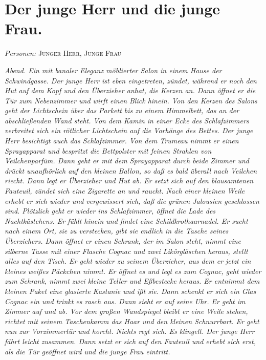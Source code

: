 \documentclass[
	final,
	a4paper,
	ngerman,
	mpinclude = true, %
	twoside = true,
	open = right,
	cleardoublepage = plain,
	DIV = 13,
	BCOR = 1cm,
	titlepage = firstiscover,
	]{scrbook}
\newcommand{\scene}{\section}
\newcommand{\setting}[1]{\vspace{-0.5\baselineskip}\centering\textit{#1}}
\newcommand{\characterlist}[1]{{\begin{center}\textit{Personen:} #1\end{center}}}
\newcommand{\thecharacter}[1]{\textup{\textsc{#1}}\xspace}
\newcommand{\theherr}{\thecharacter{Junger Herr}}
\newcommand{\thefrau}{\thecharacter{Junge Frau}}
\begin{document}
\scene{Der junge Herr und die junge Frau.}
\characterlist{\theherr, \thefrau}
\setting{Abend. Ein mit banaler Eleganz möblierter Salon in einem Hause der Schwindgasse. Der junge Herr ist eben eingetreten, zündet, während er noch den Hut auf dem Kopf und den Überzieher anhat, die Kerzen an. Dann öffnet er die Tür zum Nebenzimmer und wirft einen Blick hinein. Von den Kerzen des Salons geht der Lichtschein über das Parkett bis zu einem Himmelbett, das an der abschließenden Wand steht. Von dem Kamin in einer Ecke des Schlafzimmers verbreitet sich ein rötlicher Lichtschein auf die Vorhänge des Bettes. Der junge Herr besichtigt auch das Schlafzimmer. Von dem Trumeau nimmt er einen Sprayapparat und bespritzt die Bettpolster mit feinen Strahlen von Veilchenparfüm. Dann geht er mit dem Sprayapparat durch beide Zimmer und drückt unaufhörlich auf den kleinen Ballon, so daß es bald überall nach Veilchen riecht. Dann legt er Überzieher und Hut ab. Er setzt sich auf den blausamtenen Fauteuil, zündet sich eine Zigarette an und raucht. Nach einer kleinen Weile erhebt er sich wieder und vergewissert sich, daß die grünen Jalousien geschlossen sind. Plötzlich geht er wieder ins Schlafzimmer, öffnet die Lade des Nachtkästchens. Er fühlt hinein und findet eine Schildkrothaarnadel. Er sucht nach einem Ort, sie zu verstecken, gibt sie endlich in die Tasche seines Überziehers. Dann öffnet er einen Schrank, der im Salon steht, nimmt eine silberne Tasse mit einer Flasche Cognac und zwei Likörgläschen heraus, stellt alles auf den Tisch. Er geht wieder zu seinem Überzieher, aus dem er jetzt ein kleines weißes Päckchen nimmt. Er öffnet es und legt es zum Cognac, geht wieder zum Schrank, nimmt zwei kleine Teller und Eßbestecke heraus. Er entnimmt dem kleinen Paket eine glasierte Kastanie und ißt sie. Dann schenkt er sich ein Glas Cognac ein und trinkt es rasch aus. Dann sieht er auf seine Uhr. Er geht im Zimmer auf und ab. Vor dem großen Wandspiegel bleibt er eine Weile stehen, richtet mit seinem Taschenkamm das Haar und den kleinen Schnurrbart. Er geht nun zur Vorzimmertür und horcht. Nichts regt sich. Es klingelt. Der junge Herr fährt leicht zusammen. Dann setzt er sich auf den Fauteuil und erhebt sich erst, als die Tür geöffnet wird und die junge Frau eintritt.}
\end{document}
